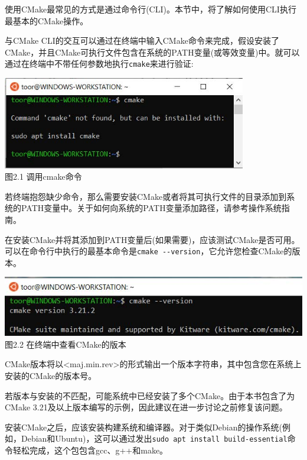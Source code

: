 
使用CMake最常见的方式是通过命令行(CLI)。本节中，将了解如何使用CLI执行最基本的CMake操作。

与CMake CLI的交互可以通过在终端中输入CMake命令来完成，假设安装了CMake，并且CMake可执行文件包含在系统的PATH变量(或等效变量)中。就可以通过在终端中不带任何参数地执行\texttt{cmake}来进行验证:

\begin{center}
\includegraphics[width=0.8\textwidth]{content/1/chapter2/images/1.jpg}\\
图2.1 调用cmake命令
\end{center}

若终端抱怨缺少命令，那么需要安装CMake或者将其可执行文件的目录添加到系统的PATH变量中。关于如何向系统的PATH变量添加路径，请参考操作系统指南。

在安装CMake并将其添加到PATH变量后(如果需要)，应该测试CMake是否可用。可以在命令行中执行的最基本命令是\texttt{cmake -{}-version}，它允许您检查CMake的版本。

\begin{center}
\includegraphics[width=1.\textwidth]{content/1/chapter2/images/2.jpg}\\
图2.2 在终端中查看CMake的版本
\end{center}

CMake版本将以<maj.min.rev>的形式输出一个版本字符串，其中包含您在系统上安装的CMake的版本号。

\begin{tcolorbox}[colback=webgreen!5!white,colframe=webgreen!75!black,title=Note]
若版本与安装的不匹配，可能系统中已经安装了多个CMake。由于本书包含了为CMake 3.21及以上版本编写的示例，因此建议在进一步讨论之前修复该问题。
\end{tcolorbox}

安装CMake之后，应该安装构建系统和编译器。对于类似Debian的操作系统(例如，Debian和Ubuntu)，这可以通过发出\texttt{sudo apt install build-essential}命令轻松完成，这个包包含gcc、g++和make。

